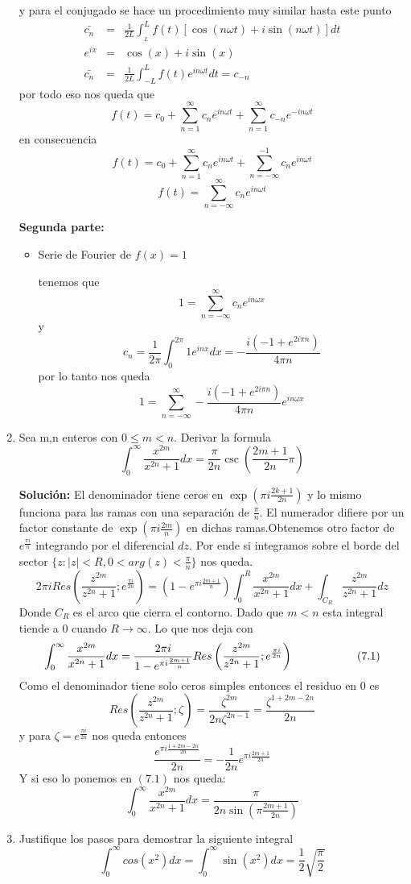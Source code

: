 \documentclass[12pt]{exam}
\begin{document}
\begin{enumerate}
    y para el conjugado se hace un procedimiento muy similar hasta este punto
    \begin{eqnarray*}
        \bar{c_n} &=& \frac{1}{2L}\int_{_L}^{L}f(t)[\cos(n\omega t)+i\sin(n\omega t)]dt\\
        e^{ix} &=& \cos(x)+i\sin(x)\\
        \bar{c_n} &=& \frac{1}{2L}\int_{-L}^{L}f(t)e^{in\omega t}dt = c_{-n}
    \end{eqnarray*}
    por todo eso nos queda que
    $$f(t) = c_0 + \sum_{n=1}^{\infty}c_ne^{in\omega t}+\sum_{n=1}^{\infty}c_{-n}e^{-in\omega t}$$
    en consecuencia
    $$f(t)=c_0 + \sum_{n=1}^{\infty}c_ne^{in\omega t}+\sum_{n=-\infty}^{-1}c_{n}e^{in\omega t}$$
    $$f(t)=\sum_{n=-\infty}^{\infty}c_ne^{in\omega t}$$

    \textbf{Segunda parte: }
    \begin{itemize}
        \item Serie de Fourier de $f(x)=1$
        
        tenemos que $$1 = \sum_{n=-\infty}^{\infty}c_ne^{in\omega x}$$
        y $$c_n = \frac{1}{2\pi}\int_0^{2\pi}1e^{inx}dx =-\frac{i(-1+e^{2i\pi n})}{4\pi n}$$ por lo tanto nos queda
        $$1 = \sum_{n=-\infty}^{\infty}-\frac{i(-1+e^{2i\pi n})}{4\pi n}e^{in\omega x}$$
    \end{itemize}
    \item Sea m,n enteros con $0\leq m < n$. Derivar la formula $$\int_0^\infty \frac{x^{2m}}{x^{2n}+1}dx = \frac{\pi}{2n}\csc\left(\frac{2m+1}{2n}\pi\right)$$
    
    \textbf{Solución: } El denominador tiene ceros en $\exp(\pi i\frac{2k + 1}{2n})$ y lo mismo funciona para las ramas con una separación de
    $\frac{\pi}{n}$. El numerador difiere por un factor constante de $\exp(\pi i \frac{2m}{n})$ en dichas ramas.Obtenemos otro factor de 
    $e^{\frac{\pi i}{n}}$ integrando por el diferencial $dz$. Por ende si integramos sobre el borde del sector $\{z:|z|<R,0<arg(z)<\frac{\pi}{n}\}$
    nos queda. $$2\pi i Res \left(\frac{z^{2m}}{z^{2n}+1};e^{\frac{\pi i}{2n}}\right)=\left(1-e^{\pi i \frac{2m+1}{n}}\right)\int_0^R \frac{x^{2m}}{x^{2n}+1}dx + \int_{C_R}\frac{z^{2m}}{z^{2n}+1}dz$$
    Donde $C_R$ es el arco que cierra el contorno. Dado que $m<n$ esta integral tiende a 0 cuando $R\to\infty$. Lo que nos deja con 
    $$\int_0^{\infty}\frac{x^{2m}}{x^{2n}+1}dx = \frac{2 \pi i}{1-e^{\pi i \frac{2m+1}{n}}}Res \left(\frac{z^{2m}}{z^{2n}+1};e^{\frac{\pi i}{2n}}\right) \hspace*{2cm} (7.1)$$
    Como el denominador tiene solo ceros simples entonces el residuo en 0 es 
    $$Res\left(\frac{z^{2m}}{z^{2n}+1};\zeta\right)=\frac{\zeta^{2m}}{2n\zeta^{2n-1}}=\frac{\zeta^{1+2m-2n}}{2n}$$
    y para $\zeta = e^{\frac{\pi i}{2n}}$ nos queda entonces $$\frac{e^{\pi i \frac{1+2m-2n}{2n}}}{2n}=-\frac{1}{2n}e^{\pi i \frac{2m+1}{2n}}$$
    Y si eso lo ponemos en $(7.1)$ nos queda: $$\int_0^{\infty}\frac{x^{2m}}{x^{2n}+1}dx = \frac{\pi}{2n\sin\left(\pi\frac{2m+1}{2n}\right)}$$
    \item Justifique los pasos para demostrar la siguiente integral $$\int_0^\infty cos(x^2)dx = \int_0^\infty \sin(x^2)dx = \frac{1}{2}\sqrt{\frac{\pi}{2}}$$
    

\end{enumerate}
\end{document}
